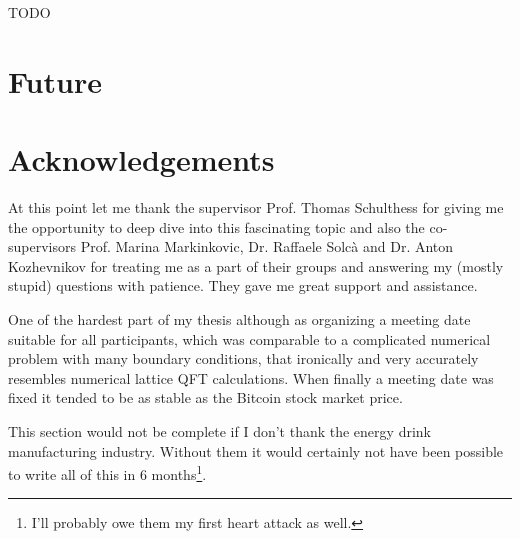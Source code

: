 \documentclass{article}
\theoremstyle{plain} %
\theoremstyle{convention} %
\theoremstyle{remark} %
\numberwithin{equation}{section}
\begin{document}
TODO

\section{Future}

\section{Acknowledgements}

At this point let me thank the supervisor Prof. Thomas Schulthess for giving me the opportunity to deep dive into this fascinating topic and also the co-supervisors Prof. Marina Markinkovic, Dr. Raffaele Solcà and Dr. Anton Kozhevnikov for treating me as a part of their groups and answering my (mostly stupid) questions with patience. They gave me great support and assistance.

One of the hardest part of my thesis although as organizing a meeting date suitable for all participants, which was comparable to a complicated numerical problem with many boundary conditions, that ironically and very accurately resembles numerical lattice QFT calculations. When finally a meeting date was fixed it tended to be as stable as the Bitcoin stock market price.

This section would not be complete if I don't thank the energy drink manufacturing industry. Without them it would certainly not have been possible to write all of this in \num{6} months\footnote{I'll probably owe them my first heart attack as well.}.


\newpage





\newpage
\end{document}
